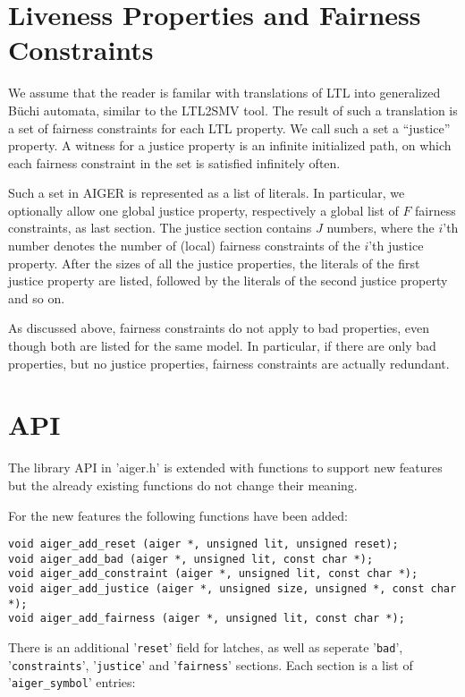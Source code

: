 \documentclass{llncs}
\begin{document}
\section{Liveness Properties and Fairness Constraints}

We assume that the reader is familar with translations of LTL into
generalized B\"{u}chi automata, similar to the LTL2SMV tool.
The result of such a translation is a set of fairness constraints for each
LTL property.  We call such a set a ``justice'' property.  A witness for a
justice property is an infinite initialized path, on which each
fairness constraint in the set is satisfied infinitely often.

Such a set in AIGER is represented as a list of literals.  In particular, we
optionally allow one global justice property, respectively a global list of
$F$ fairness constraints, as last section.  The justice section contains $J$
numbers, where the $i$'th number denotes the number of (local) fairness
constraints of the $i$'th justice property.  After the sizes of all the
justice properties, the literals of the first justice property are listed,
followed by the literals of the second justice property and so on.

As discussed above, fairness constraints do not apply to bad properties, even
though both are listed for the same model.  In particular, if there are only
bad properties, but no justice properties, fairness constraints are actually
redundant.

\section{API}

The library API in 'aiger.h' is extended with functions to support new
features but the already existing functions do not change their meaning.

For the new features the following functions have been added:
{\small
\begin{verbatim}
void aiger_add_reset (aiger *, unsigned lit, unsigned reset);
void aiger_add_bad (aiger *, unsigned lit, const char *);
void aiger_add_constraint (aiger *, unsigned lit, const char *);
void aiger_add_justice (aiger *, unsigned size, unsigned *, const char *);
void aiger_add_fairness (aiger *, unsigned lit, const char *);
\end{verbatim}}

There is an additional '\texttt{reset}' field for latches, as well as 
seperate '\texttt{bad}', '\texttt{constraints}', '\texttt{justice}' and
'\texttt{fairness}' sections.  Each section
is a list of '\texttt{aiger\_symbol}' entries:
\end{document}
